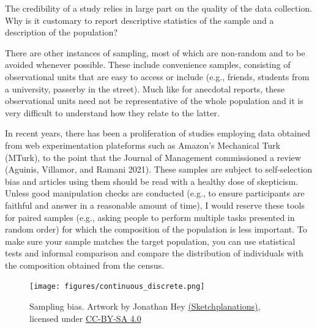 \documentclass[
  11pt,
  letterpaper,
]{scrbook}
\theoremstyle{definition}
\theoremstyle{remark}
\begin{document}
\begin{tcolorbox}[enhanced jigsaw, title=\textcolor{quarto-callout-note-color}{\faInfo}\hspace{0.5em}{Thinking outside the box}, bottomtitle=1mm, opacitybacktitle=0.6, colframe=quarto-callout-note-color-frame, leftrule=.75mm, coltitle=black, colbacktitle=quarto-callout-note-color!10!white, colback=white, toprule=.15mm, rightrule=.15mm, breakable, bottomrule=.15mm, opacityback=0, toptitle=1mm, titlerule=0mm, arc=.35mm, left=2mm]

The credibility of a study relies in large part on the quality of the
data collection. Why is it customary to report descriptive statistics of
the sample and a description of the population?

\end{tcolorbox}

There are other instances of sampling, most of which are non-random and
to be avoided whenever possible. These include convenience samples,
consisting of observational units that are easy to access or include
(e.g., friends, students from a university, passerby in the street).
Much like for anecdotal reports, these observational units need not be
representative of the whole population and it is very difficult to
understand how they relate to the latter.

In recent years, there has been a proliferation of studies employing
data obtained from web experimentation plateforms such as Amazon's
Mechanical Turk (MTurk), to the point that the Journal of Management
commissioned a review (Aguinis, Villamor, and Ramani 2021). These
samples are subject to self-selection bias and articles using them
should be read with a healthy dose of skepticism. Unless good
manipulation checks are conducted (e.g., to ensure participants are
faithful and answer in a reasonable amount of time), I would reserve
these tools for paired samples (e.g., asking people to perform multiple
tasks presented in random order) for which the composition of the
population is less important. To make sure your sample matches the
target population, you can use statistical tests and informal comparison
and compare the distribution of individuals with the composition
obtained from the census.

\begin{figure}[ht!]

{\centering \texttt{[image: figures/continuous\_discrete.png]}

}

\caption{\label{fig-samplingbias}Sampling bias. Artwork by Jonathan Hey
\href{https://sketchplanations.com/sampling-bias}{(Sketchplanations)},
licensed under
\href{https://creativecommons.org/licenses/by-nc/4.0/}{CC-BY-SA 4.0}}

\end{figure}
\end{document}
